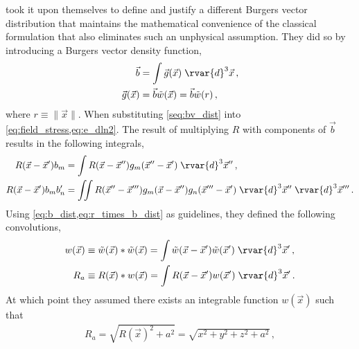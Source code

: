  took it upon themselves to define and justify a different Burgers vector distribution that maintains the mathematical convenience of the classical formulation that also eliminates such an unphysical assumption. They did so by introducing a Burgers vector density function,
\begin{subequations}\label{eq:b_dist}
    \begin{align}
        \vec{b}          & = \int \vec{g}(\vec{x}) \;\rvar{d}^{3} \vec{x}\label{seq:bv_dist}\,, \\
        \vec{g}(\vec{x}) & = \vec{b} \tilde{w}(\vec{x}) = \vec{b} \tilde{w}(r)\,,
    \end{align}
\end{subequations}
where $ r \equiv \lVert \vec{x} \rVert $. When substituting \cref{seq:bv_dist} into \cref{eq:field_stress,eq:e_dln2}. The result of multiplying $ R $ with components of $ \vec{b} $ results in the following integrals,
\begin{subequations}\label{eq:r_times_b_dist}
    \begin{align}
        R(\vec{x} - \vec{x}') b_{m}        & = \int R(\vec{x} - \vec{x}'') g_{m}(\vec{x}'' - \vec{x}') \;\rvar{d}^{3}\vec{x}''\,,                                                          \\
        R(\vec{x} - \vec{x}') b_{m} b'_{n} & = \iint R(\vec{x}'' - \vec{x}''') g_{m}(\vec{x} - \vec{x}'') g_{n}(\vec{x}''' - \vec{x}') \;\rvar{d}^{3}\vec{x}'' \;\rvar{d}^{3}\vec{x}'''\,.
    \end{align}
\end{subequations}
Using \cref{eq:b_dist,eq:r_times_b_dist} as guidelines, they defined the following convolutions,
\begin{subequations}
    \begin{align}
        w(\vec{x}) & \equiv \tilde{w}(\vec{x}) * \tilde{w}(\vec{x}) = \int \tilde{w}(\vec{x}-\vec{x}')\tilde{w}(\vec{x}')\; \rvar{d}^{3} \vec{x}'\,, \\
        R_{a}      & \equiv R(\vec{x}) * w(\vec{x}) = \int R(\vec{x} - \vec{x}') w(\vec{x}') \;\rvar{d}^{3} \vec{x}'\,.
    \end{align}
\end{subequations}
At which point they assumed there exists an integrable function $ w(\vec{x}) $ such that
\begin{align}
    R_{a} = \sqrt{R(\vec{x})^{2} + a^{2}} = \sqrt{x^{2} + y^{2} + z^{2} + a^{2}}\,,
\end{align}
